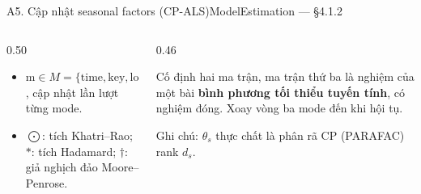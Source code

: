 \begin{frame}{A5. Cập nhật seasonal factors (CP-ALS)}{ModelEstimation --- §4.1.2}
\vspace{3mm}
\begin{columns}[T,onlytextwidth]
\begin{column}{0.50\textwidth}
\small
\begin{itemize}
  \item $\mathrm m\in M=\{\mathrm{time},\mathrm{key},\mathrm{loc}\}$, cập nhật lần lượt từng mode.
  \item $\bigodot$: tích Khatri--Rao; $\ast$: tích Hadamard; $\dagger$: giả nghịch đảo Moore--Penrose.
\end{itemize}
\end{column}
\begin{column}{0.46\textwidth}
\begin{intuition}[Ý tưởng]
  \small Cố định hai ma trận, ma trận thứ ba là nghiệm của một bài \textbf{bình phương tối thiểu tuyến tính}, có nghiệm đóng.
  Xoay vòng ba mode đến khi hội tụ.
\end{intuition}
\vspace{1mm}
{\small\color{DTMuted}Ghi chú: $\theta_s$ thực chất là phân rã CP (PARAFAC) rank $d_s$.\par}
\end{column}
\end{columns}
\vfill
{}
\end{frame}

